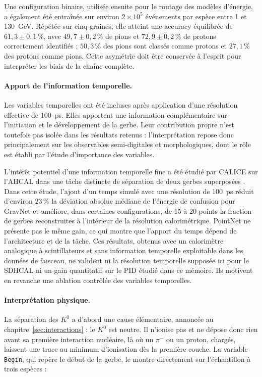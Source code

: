 Une configuration binaire, utilisée ensuite pour le routage des modèles d'énergie, a également été entraînée sur environ $2\times10^{5}$ événements par espèce entre 1 et 130~GeV. Répétée sur cinq graines, elle atteint une accuracy équilibrée de $61{,}3 \pm 0{,}1\,\%$, avec $49{,}7 \pm 0{,}2\,\%$ de pions et $72{,}9 \pm 0{,}2\,\%$ de protons correctement identifiés ; $50{,}3\,\%$ des pions sont classés comme protons et $27{,}1\,\%$ des protons comme pions. Cette asymétrie doit être conservée à l'esprit pour interpréter les biais de la chaîne complète.

\paragraph{Apport de l'information temporelle.}

Les variables temporelles ont été incluses après application d'une résolution effective de 100~ps. Elles apportent une information complémentaire sur l'initiation et le développement de la gerbe. Leur contribution propre n'est toutefois pas isolée dans les résultats retenus : l'interprétation repose donc principalement sur les observables semi-digitales et morphologiques, dont le rôle est établi par l'étude d'importance des variables.

L'intérêt potentiel d'une information temporelle fine a été étudié par CALICE sur l'AHCAL dans une tâche distincte de séparation de deux gerbes superposées \cite{calice2024showerseparation}. Dans cette étude, l'ajout d'un temps simulé avec une résolution de 100~ps réduit d'environ $23\,\%$ la déviation absolue médiane de l'énergie de confusion pour GravNet et améliore, dans certaines configurations, de 15 à 20 points la fraction de gerbes reconstruites à l'intérieur de la résolution calorimétrique. PointNet ne présente pas le même gain, ce qui montre que l'apport du temps dépend de l'architecture et de la tâche. Ces résultats, obtenus avec un calorimètre analogique à scintillateurs et sans information temporelle exploitable dans les données de faisceau, ne valident ni la résolution temporelle supposée ici pour le SDHCAL ni un gain quantitatif sur le PID étudié dans ce mémoire. Ils motivent en revanche une ablation contrôlée des variables temporelles.

\paragraph{Interprétation physique.}

La séparation des $K^0$ a d'abord une cause élémentaire, annoncée au chapitre~\ref{sec:interactions} : le $K^0$ est neutre. Il n'ionise pas et ne dépose donc rien avant sa première interaction nucléaire, là où un $\pi^-$ ou un proton, chargés, laissent une trace au minimum d'ionisation dès la première couche. La variable \texttt{Begin}, qui repère le début de la gerbe, le montre directement sur l'échantillon à trois espèces :

